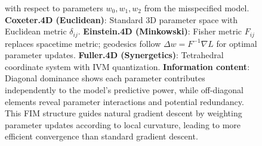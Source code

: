\documentclass[
  10pt,
]{article}
\begin{document}
\begin{figure}
{with respect to parameters \(w_0, w_1, w_2\) from the misspecified
model. \textbf{Coxeter.4D (Euclidean)}: Standard 3D parameter space with
Euclidean metric \(\delta_{ij}\). \textbf{Einstein.4D (Minkowski)}:
Fisher metric \(F_{ij}\) replaces spacetime metric; geodesics follow
\(\Delta w = F^{-1}\nabla L\) for optimal parameter updates.
\textbf{Fuller.4D (Synergetics)}: Tetrahedral coordinate system with IVM
quantization. \textbf{Information content}: Diagonal dominance shows
each parameter contributes independently to the model's predictive
power, while off-diagonal elements reveal parameter interactions and
potential redundancy. This FIM structure guides natural gradient descent
by weighting parameter updates according to local curvature, leading to
more efficient convergence than standard gradient descent.}
\end{figure}
\end{document}
